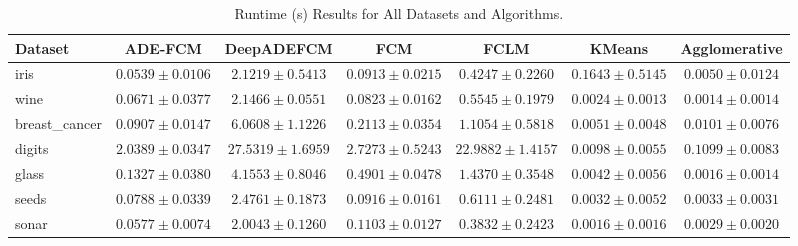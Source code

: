 \begin{table}[ht]
\centering
\caption{Runtime (s) Results for All Datasets and Algorithms.}
\label{tab:runtime}
\begin{tabular}{lcccccc}
\toprule
Dataset & ADE-FCM & DeepADEFCM & FCM & FCLM & KMeans & Agglomerative \\
\midrule
iris & $0.0539\pm0.0106$ & $2.1219\pm0.5413$ & $0.0913\pm0.0215$ & $0.4247\pm0.2260$ & $0.1643\pm0.5145$ & $0.0050\pm0.0124$ \\
wine & $0.0671\pm0.0377$ & $2.1466\pm0.0551$ & $0.0823\pm0.0162$ & $0.5545\pm0.1979$ & $0.0024\pm0.0013$ & $0.0014\pm0.0014$ \\
breast_cancer & $0.0907\pm0.0147$ & $6.0608\pm1.1226$ & $0.2113\pm0.0354$ & $1.1054\pm0.5818$ & $0.0051\pm0.0048$ & $0.0101\pm0.0076$ \\
digits & $2.0389\pm0.0347$ & $27.5319\pm1.6959$ & $2.7273\pm0.5243$ & $22.9882\pm1.4157$ & $0.0098\pm0.0055$ & $0.1099\pm0.0083$ \\
glass & $0.1327\pm0.0380$ & $4.1553\pm0.8046$ & $0.4901\pm0.0478$ & $1.4370\pm0.3548$ & $0.0042\pm0.0056$ & $0.0016\pm0.0014$ \\
seeds & $0.0788\pm0.0339$ & $2.4761\pm0.1873$ & $0.0916\pm0.0161$ & $0.6111\pm0.2481$ & $0.0032\pm0.0052$ & $0.0033\pm0.0031$ \\
sonar & $0.0577\pm0.0074$ & $2.0043\pm0.1260$ & $0.1103\pm0.0127$ & $0.3832\pm0.2423$ & $0.0016\pm0.0016$ & $0.0029\pm0.0020$ \\
\bottomrule
\end{tabular}
\end{table}
